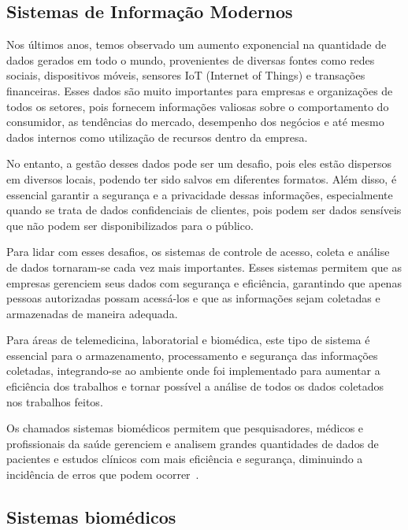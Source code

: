 \subsection{Sistemas de Informação Modernos}


Nos últimos anos, temos observado um aumento exponencial na quantidade de dados gerados em todo o mundo, provenientes de diversas fontes como redes sociais, dispositivos móveis, sensores IoT (Internet of Things) e transações financeiras.
Esses dados são muito importantes para empresas e organizações de todos os setores, pois fornecem informações valiosas sobre o comportamento do consumidor, as tendências do mercado, desempenho dos negócios e até mesmo dados internos como utilização de recursos dentro da empresa.

No entanto, a gestão desses dados pode ser um desafio, pois eles estão dispersos em diversos locais, podendo ter sido salvos em diferentes formatos. Além disso, é essencial garantir a segurança e a privacidade dessas informações, especialmente quando se trata de dados confidenciais de clientes, pois podem ser dados sensíveis que não podem ser disponibilizados para o público.

Para lidar com esses desafios, os sistemas de controle de acesso, coleta e análise de dados tornaram-se cada vez mais importantes. Esses sistemas permitem que as empresas gerenciem seus dados com segurança e eficiência, garantindo que apenas pessoas autorizadas possam acessá-los e que as informações sejam coletadas e armazenadas de maneira adequada.

Para áreas de telemedicina, laboratorial e biomédica, este tipo de sistema é essencial para o armazenamento, processamento e segurança das informações coletadas, integrando-se ao ambiente onde foi implementado para aumentar a eficiência dos trabalhos e tornar possível a análise de todos os dados coletados nos trabalhos feitos.

Os chamados sistemas biomédicos permitem que pesquisadores, médicos e profissionais da saúde gerenciem e analisem grandes quantidades de dados de pacientes e estudos clínicos com mais eficiência e segurança, diminuindo a incidência de erros que podem ocorrer~\cite{Sun2021LaboratoryEfficiency}.

\subsection{Sistemas biomédicos}

